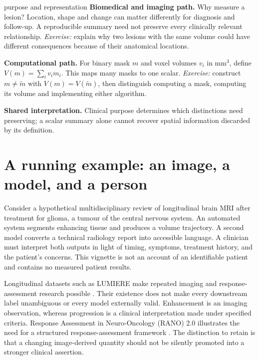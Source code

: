 \documentclass[11pt,a4paper]{article}
\begin{document}
\begin{perspectives}{purpose and representation}
\textbf{Biomedical and imaging path.} Why measure a lesion? Location, shape and change can matter differently for diagnosis and follow-up. A reproducible summary need not preserve every clinically relevant relationship. \emph{Exercise:} explain why two lesions with the same volume could have different consequences because of their anatomical locations.

\textbf{Computational path.} For binary mask $m$ and voxel volumes $v_i$ in mm$^3$, define $V(m)=\sum_i v_i m_i$. This maps many masks to one scalar. \emph{Exercise:} construct $m\neq\tilde m$ with $V(m)=V(\tilde m)$, then distinguish computing a mask, computing its volume and implementing either algorithm.

\textbf{Shared interpretation.} Clinical purpose determines which distinctions need preserving; a scalar summary alone cannot recover spatial information discarded by its definition.
\end{perspectives}


\section{A running example: an image, a model, and a person}\label{sec:clinical}
Consider a hypothetical multidisciplinary review of longitudinal brain MRI after treatment for glioma, a tumour of the central nervous system. An automated system segments enhancing tissue and produces a volume trajectory. A second model converts a technical radiology report into accessible language. A clinician must interpret both outputs in light of timing, symptoms, treatment history, and the patient's concerns. This vignette is not an account of an identifiable patient and contains no measured patient results.

Longitudinal datasets such as LUMIERE make repeated imaging and response-assessment research possible \citep{suter2022}. Their existence does not make every downstream label unambiguous or every model externally valid. Enhancement is an imaging observation, whereas progression is a clinical interpretation made under specified criteria. Response Assessment in Neuro-Oncology (RANO) 2.0 illustrates the need for a structured response-assessment framework \citep{wen2023}. The distinction to retain is that a changing image-derived quantity should not be silently promoted into a stronger clinical assertion.
\end{document}
